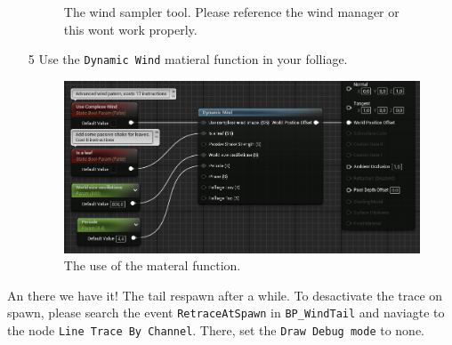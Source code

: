 \documentclass[../main.tex]{subfile}
\begin{document}
\begin{itemize}
\begin{figure}[H]
            \caption{The wind sampler tool. Please reference the wind manager or this wont work properly.}
        \end{figure}
        \item[5] Use the \texttt{Dynamic Wind} matieral function in your folliage.
        \begin{figure}[H]    
            \centering
            \includegraphics[width=.75\textwidth]{Ressources/MaterialInstance.png}
            \caption{The use of the materal function.}
        \end{figure}
    \end{itemize}

    An there we have it! The tail respawn after a while. To desactivate the trace on spawn, please search the event \texttt{RetraceAtSpawn}
     in \texttt{BP\_WindTail} and naviagte to the node \texttt{Line Trace By Channel}. There, set the \texttt{Draw Debug mode} to none.
   
\end{document}
